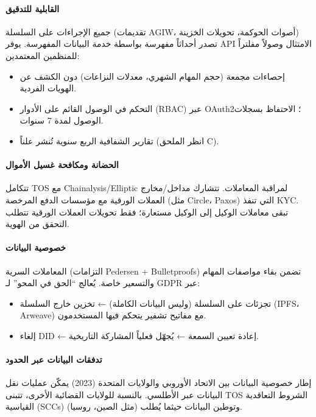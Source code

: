 \documentclass[11pt]{article}
\begin{document}
\paragraph{القابلية للتدقيق}
جميع الإجراءات على السلسلة (تقديمات AGIW، أصوات الحوكمة، تحويلات الخزينة) تصدر أحداثاً مفهرسة بواسطة خدمة البيانات المفهرسة. يوفر API الامتثال وصولاً مفلتراً للمنظمين المعتمدين:
\begin{itemize}[noitemsep]
  \item إحصاءات مجمعة (حجم المهام الشهري، معدلات النزاعات) دون الكشف عن الهويات الفردية.
  \item التحكم في الوصول القائم على الأدوار (RBAC) عبر OAuth2؛ الاحتفاظ بسجلات الوصول لمدة 7 سنوات.
  \item تقارير الشفافية الربع سنوية تُنشر علناً (انظر الملحق C).
\end{itemize}

\paragraph{الحضانة ومكافحة غسيل الأموال}
تتكامل TOS مع Chainalysis/Elliptic لمراقبة المعاملات. تتشارك مداخل/مخارج العملات الورقية مع مؤسسات الدفع المرخصة (مثل Circle، Paxos) التي تنفذ KYC. تبقى معاملات الوكيل إلى الوكيل مستعارة؛ فقط تحويلات العملات الورقية تتطلب التحقق من الهوية.

\paragraph{خصوصية البيانات}
المعاملات السرية (التزامات Pedersen + Bulletproofs) تضمن بقاء مواصفات المهام والتسعير خاصة. يُعالج ``الحق في المحو'' لـ GDPR عبر:
\begin{itemize}[noitemsep]
  \item تجزئات على السلسلة (وليس البيانات الكاملة) ← تخزين خارج السلسلة (IPFS، Arweave) مع مفاتيح تشفير يتحكم فيها المستخدمون.
  \item إلغاء DID ← إعادة تعيين السمعة ← يُجهّل فعلياً المشاركة التاريخية.
\end{itemize}

\paragraph{تدفقات البيانات عبر الحدود}
إطار خصوصية البيانات بين الاتحاد الأوروبي والولايات المتحدة (2023) يمكّن عمليات نقل البيانات عبر الأطلسي. بالنسبة للولايات القضائية الأخرى، تتبنى TOS الشروط التعاقدية القياسية (SCCs) وتوطين البيانات حيثما يُطلب (مثل الصين، روسيا).
\end{document}
